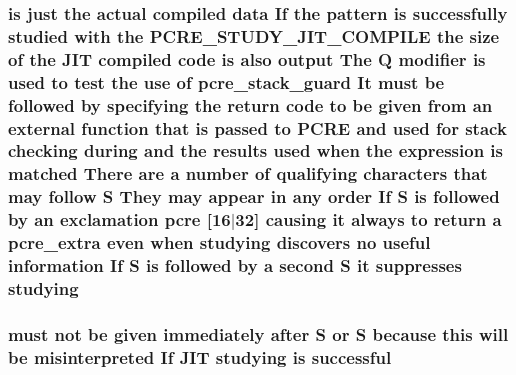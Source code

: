 \subsubsection[{\texorpdfstring{studying}{studying}}]{ {\bf is} just the actual {\bf compiled} {\bf data} If the {\bf pattern} {\bf is} successfully {\bf studied} {\bf with} the {\bf P\+C\+R\+E\+\_\+\+S\+T\+U\+D\+Y\+\_\+\+J\+I\+T\+\_\+\+C\+O\+M\+P\+I\+LE} the {\bf size} {\bf of} the J\+IT {\bf compiled} {\bf code} {\bf is} also {\bf output} The Q {\bf modifier} {\bf is} {\bf used} {\bf to} test the use {\bf of} {\bf pcre\+\_\+stack\+\_\+guard} It must {\bf be} followed by {\bf specifying} the return {\bf code} {\bf to} {\bf be} {\bf given} {\bf from} an external {\bf function} that {\bf is} passed {\bf to} {\bf P\+C\+RE} and {\bf used} for {\bf stack} checking during and the {\bf results} {\bf used} when the {\bf expression} {\bf is} {\bf matched} There {\bf are} {\bf a} {\bf number} {\bf of} qualifying {\bf characters} that may follow {\bf S} They may appear {\bf in} {\bf any} {\bf order} If {\bf S} {\bf is} followed by an exclamation {\bf pcre} \mbox{[}16$\vert$32\mbox{]} causing {\bf it} always {\bf to} return {\bf a} {\bf pcre\+\_\+extra} even when studying discovers no useful information If {\bf S} {\bf is} followed by {\bf a} {\bf second} {\bf S} {\bf it} suppresses studying}\hypertarget{pcretest_8txt_a5b51af48c43885cde41560bc9314251b}{}\label{pcretest_8txt_a5b51af48c43885cde41560bc9314251b}
\subsubsection[{\texorpdfstring{successful}{successful}}]{ must {\bf not} {\bf be} {\bf given} immediately {\bf after} {\bf S} {\bf or} {\bf S} because {\bf this} will {\bf be} misinterpreted If J\+IT {\bf studying} {\bf is} successful}\hypertarget{pcretest_8txt_a5053c0fb3a30614004bd10cd8c0e5318}{}\label{pcretest_8txt_a5053c0fb3a30614004bd10cd8c0e5318}
